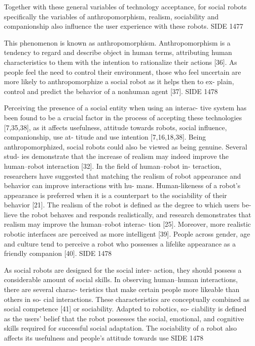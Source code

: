 Together with these general variables of technology acceptance, for social robots specifically the variables of anthropomorphism, realism, sociability and companionship also influence the user experience with these robots. SIDE 1477
  
  
 This phenomenon is known as anthropomorphism. Anthropomorphism is a tendency to regard and describe object in human terms, attributing human characteristics to them with the intention to rationalize their actions [36]. As people feel the need to control their environment, those who feel uncertain are more likely to anthropomorphize a social robot as it helps then to ex- plain, control and predict the behavior of a nonhuman agent [37]. SIDE 1478
 
 Perceiving the presence of a social entity when using an interac- tive system has been found to be a crucial factor in the process of accepting these technologies [7,35,38], as it affects usefulness, attitude towards robots, social influence, companionship, use at- titude and use intention [7,16,18,38]. Being anthropomorphized, social robots could also be viewed as being genuine. Several stud- ies demonstrate that the increase of realism may indeed improve the human–robot interaction [32]. In the field of human–robot in- teraction, researchers have suggested that matching the realism of robot appearance and behavior can improve interactions with hu- mans. Human-likeness of a robot’s appearance is preferred when it is a counterpart to the sociability of their behavior [21]. The realism of the robot is defined as the degree to which users be- lieve the robot behaves and responds realistically, and research demonstrates that realism may improve the human–robot interac- tion [25]. Moreover, more realistic robotic interfaces are perceived as more intelligent [39]. People across gender, age and culture tend to perceive a robot who possesses a lifelike appearance as a friendly companion [40]. SIDE 1478
 
 As social robots are designed for the social inter- action, they should possess a considerable amount of social skills. In observing human–human interactions, there are several charac- teristics that make certain people more likeable than others in so- cial interactions. These characteristics are conceptually combined as social competence [41] or sociability. Adapted to robotics, so- ciability is defined as the users’ belief that the robot possesses the social, emotional, and cognitive skills required for successful social adaptation. The sociability of a robot also affects its usefulness and people’s attitude towards use SIDE 1478
 
